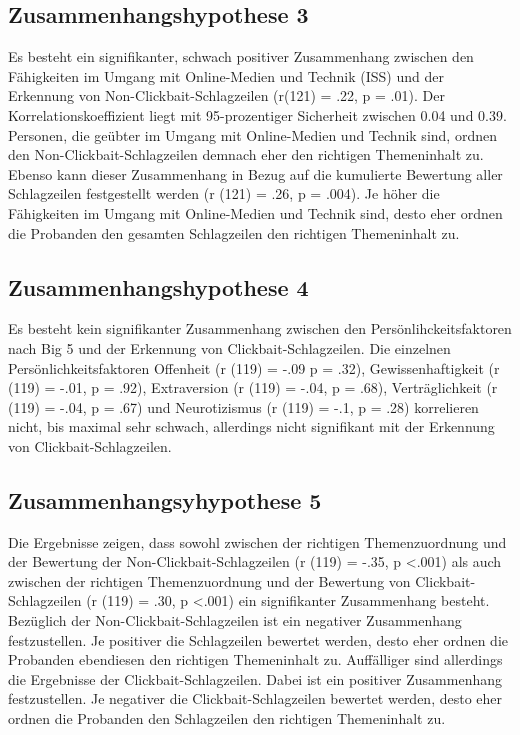 \documentclass[]{article}
\begin{document}
\subsection{Zusammenhangshypothese 3}\label{zusammenhangshypothese-3}

Es besteht ein signifikanter, schwach positiver Zusammenhang zwischen
den Fähigkeiten im Umgang mit Online-Medien und Technik (ISS) und der
Erkennung von Non-Clickbait-Schlagzeilen (r(121) = .22, p = .01). Der
Korrelationskoeffizient liegt mit 95-prozentiger Sicherheit zwischen
0.04 und 0.39. Personen, die geübter im Umgang mit Online-Medien und
Technik sind, ordnen den Non-Clickbait-Schlagzeilen demnach eher den
richtigen Themeninhalt zu. Ebenso kann dieser Zusammenhang in Bezug auf
die kumulierte Bewertung aller Schlagzeilen festgestellt werden (r (121)
= .26, p = .004). Je höher die Fähigkeiten im Umgang mit Online-Medien
und Technik sind, desto eher ordnen die Probanden den gesamten
Schlagzeilen den richtigen Themeninhalt zu.

\subsection{Zusammenhangshypothese 4}\label{zusammenhangshypothese-4}

Es besteht kein signifikanter Zusammenhang zwischen den
Persönlihckeitsfaktoren nach Big 5 und der Erkennung von
Clickbait-Schlagzeilen. Die einzelnen Persönlichkeitsfaktoren Offenheit
(r (119) = -.09 p = .32), Gewissenhaftigkeit (r (119) = -.01, p = .92),
Extraversion (r (119) = -.04, p = .68), Verträglichkeit (r (119) = -.04,
p = .67) und Neurotizismus (r (119) = -.1, p = .28) korrelieren nicht,
bis maximal sehr schwach, allerdings nicht signifikant mit der Erkennung
von Clickbait-Schlagzeilen.

\subsection{Zusammenhangsyhypothese 5}\label{zusammenhangsyhypothese-5}

Die Ergebnisse zeigen, dass sowohl zwischen der richtigen
Themenzuordnung und der Bewertung der Non-Clickbait-Schlagzeilen (r
(119) = -.35, p \textless{}.001) als auch zwischen der richtigen
Themenzuordnung und der Bewertung von Clickbait-Schlagzeilen (r (119) =
.30, p \textless{}.001) ein signifikanter Zusammenhang besteht.
Bezüglich der Non-Clickbait-Schlagzeilen ist ein negativer Zusammenhang
festzustellen. Je positiver die Schlagzeilen bewertet werden, desto eher
ordnen die Probanden ebendiesen den richtigen Themeninhalt zu.
Auffälliger sind allerdings die Ergebnisse der Clickbait-Schlagzeilen.
Dabei ist ein positiver Zusammenhang festzustellen. Je negativer die
Clickbait-Schlagzeilen bewertet werden, desto eher ordnen die Probanden
den Schlagzeilen den richtigen Themeninhalt zu.
\end{document}
